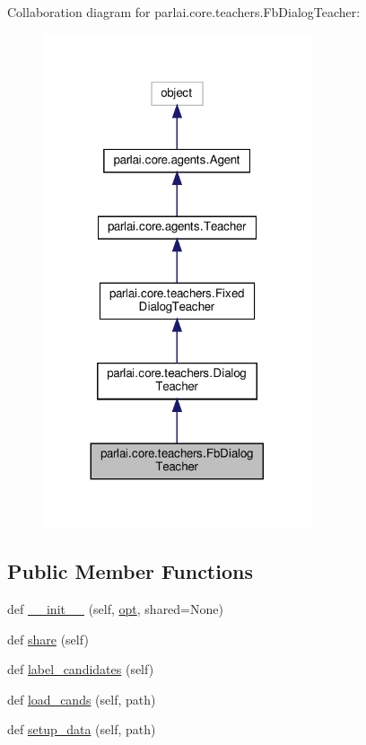 Collaboration diagram for parlai.\+core.\+teachers.\+Fb\+Dialog\+Teacher\+:
\nopagebreak
\begin{figure}[H]
\begin{center}
\leavevmode
\includegraphics[width=224pt]{d5/d01/classparlai_1_1core_1_1teachers_1_1FbDialogTeacher__coll__graph}
\end{center}
\end{figure}
\subsection*{Public Member Functions}
\begin{DoxyCompactItemize}
\item 
def \hyperlink{classparlai_1_1core_1_1teachers_1_1FbDialogTeacher_a52316baa31ca0881d4cd98ec2fbebad5}{\+\_\+\+\_\+init\+\_\+\+\_\+} (self, \hyperlink{classparlai_1_1core_1_1teachers_1_1FbDialogTeacher_af7a9ec497b9cd0292d7b8fa220da7c28}{opt}, shared=None)
\item 
def \hyperlink{classparlai_1_1core_1_1teachers_1_1FbDialogTeacher_a18a4ea7a7f21eeed7e087cb447a37c5a}{share} (self)
\item 
def \hyperlink{classparlai_1_1core_1_1teachers_1_1FbDialogTeacher_ab3ff2f1a0707aae7bf888fb13ec49641}{label\+\_\+candidates} (self)
\item 
def \hyperlink{classparlai_1_1core_1_1teachers_1_1FbDialogTeacher_ae6f10486ddf691ee868d33ea2c9dc295}{load\+\_\+cands} (self, path)
\item 
def \hyperlink{classparlai_1_1core_1_1teachers_1_1FbDialogTeacher_a6cb23867e396fac5fdcde509b5da3942}{setup\+\_\+data} (self, path)
\end{DoxyCompactItemize}

